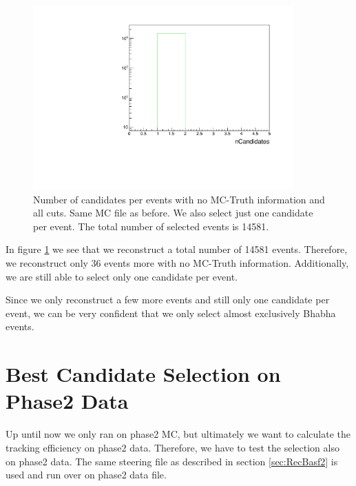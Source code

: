 \documentclass[a4paper,11pt,twosided,final,german,openbib,pdftex,listof=totoc,bibliography=totoc]{scrbook}
\begin{document}
\begin{figure}[h!]
	\centering
	\includegraphics[width=10cm]{Cuts/nCandNoMCInfo.pdf}
	\caption[Number Of Candidates Per Event With No MC-Truth Info (All Cuts)]{Number of candidates per events with no MC-Truth information and all cuts. Same MC file as before. We also select just one candidate per event. The total number of selected events is 14581.}
	\label{fig:nCandNoMCInfo}
\end{figure}

In figure \ref{fig:nCandNoMCInfo} we see that we reconstruct a total number of 14581 events. Therefore, we reconstruct only 36 events more with no MC-Truth information. Additionally, we are still able to select only one candidate per event. 

Since we only reconstruct a few more events and still only one candidate per event, we can be very confident that we only select almost exclusively Bhabha events.

\section{Best Candidate Selection on Phase2 Data}
\label{sec:SelectingBhabhaData}

Up until now we only ran on phase2 MC, but ultimately we want to calculate the tracking efficiency on phase2 data. Therefore, we have to test the selection also on phase2 data. The same steering file as described in section \ref{sec:RecBasf2} is used and run over on phase2 data file. 
\end{document}
